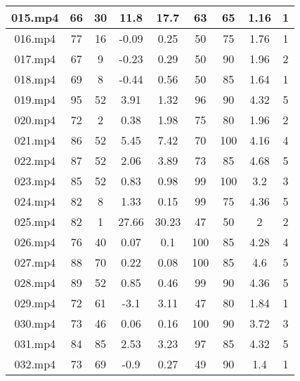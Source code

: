 \begin{enumerate}
\begin{longtable}{|c|c|c|c|c|c|c|c|c|}
		015.mp4 & 66      & 30      & 11.8    & 17.7      & 63          & 65          & 1.16 & 1     \\ \hline
		016.mp4 & 77      & 16      & -0.09   & 0.25      & 50          & 75          & 1.76 & 1     \\ \hline
		017.mp4 & 67      & 9       & -0.23   & 0.29      & 50          & 90          & 1.96 & 2     \\ \hline
		018.mp4 & 69      & 8       & -0.44   & 0.56      & 50          & 85          & 1.64 & 1     \\ \hline
		019.mp4 & 95      & 52      & 3.91    & 1.32      & 96          & 90          & 4.32 & 5     \\ \hline
		020.mp4 & 72      & 2       & 0.38    & 1.98      & 75          & 80          & 1.96 & 2     \\ \hline
		021.mp4 & 86      & 52      & 5.45    & 7.42      & 70          & 100         & 4.16 & 4     \\ \hline
		022.mp4 & 87      & 52      & 2.06    & 3.89      & 73          & 85          & 4.68 & 5     \\ \hline
		023.mp4 & 85      & 52      & 0.83    & 0.98      & 99          & 100         & 3.2  & 3     \\ \hline
		024.mp4 & 82      & 8       & 1.33    & 0.15      & 99          & 75          & 4.36 & 5     \\ \hline
		025.mp4 & 82      & 1       & 27.66   & 30.23     & 47          & 50          & 2    & 2     \\ \hline
		026.mp4 & 76      & 40      & 0.07    & 0.1       & 100         & 85          & 4.28 & 4     \\ \hline
		027.mp4 & 88      & 70      & 0.22    & 0.08      & 100         & 85          & 4.6  & 5     \\ \hline
		028.mp4 & 89      & 52      & 0.85    & 0.46      & 99          & 90          & 4.36 & 5     \\ \hline
		029.mp4 & 72      & 61      & -3.1    & 3.11      & 47          & 80          & 1.84 & 1     \\ \hline
		030.mp4 & 73      & 46      & 0.06    & 0.16      & 100         & 90          & 3.72 & 3     \\ \hline
		031.mp4 & 84      & 85      & 2.53    & 3.23      & 97          & 85          & 4.32 & 5     \\ \hline
		032.mp4 & 73      & 69      & -0.9    & 0.27      & 49          & 90          & 1.4  & 1     \\ \hline

\end{longtable}
\end{enumerate}

